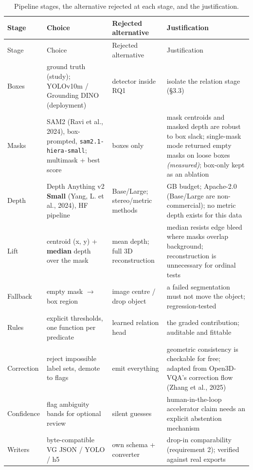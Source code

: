 \begin{center}
\setlength{\tabcolsep}{3pt}
\footnotesize
\begin{longtable}{>{\raggedright\arraybackslash}p{}>{\raggedright\arraybackslash}p{}>{\raggedright\arraybackslash}p{}>{\raggedright\arraybackslash}p{}}
\caption[Pipeline stages, the alternative rejected at each stage]{Pipeline stages, the alternative rejected at each stage, and the justification.}\\
\hline
Stage & Choice & Rejected alternative & Justification \\
\hline
\endfirsthead
\hline
Stage & Choice & Rejected alternative & Justification \\
\hline
\endhead
Boxes & ground truth (study); YOLOv10m / Grounding DINO (deployment) & detector inside RQ1 & isolate the relation stage (\S{}3.3) \\
Masks & SAM2 (Ravi et al., 2024), box-prompted, \texttt{sam2.1-hiera-small}; multimask + best score & boxes only & mask centroids and masked depth are robust to box slack; single-mask mode returned empty masks on loose boxes \textit{(measured)}; box-only kept as an ablation \\
Depth & Depth Anything v2 \textbf{Small} (Yang, L. et al., 2024), HF pipeline & Base/Large; stereo/metric methods & 6 GB budget; Apache-2.0 (Base/Large are non-commercial); no metric depth exists for this data \\
Lift & centroid (x, y) + \textbf{median} depth over the mask & mean depth; full 3D reconstruction & median resists edge bleed where masks overlap background; reconstruction is unnecessary for ordinal tests \\
Fallback & empty mask $\rightarrow$ box region & image centre / drop object & a failed segmentation must not move the object; regression-tested \\
Rules & explicit thresholds, one function per predicate & learned relation head & the graded contribution; auditable and fittable \\
Correction & reject impossible label sets, demote to flags & emit everything & geometric consistency is checkable for free; adapted from Open3D-VQA's correction flow (Zhang et al., 2025) \\
Confidence & flag ambiguity bands for optional review & silent guesses & human-in-the-loop accelerator claim needs an explicit abstention mechanism \\
Writers & byte-compatible VG JSON / YOLO / h5 & own schema + converter & drop-in comparability (requirement 2); verified against real exports \\
\hline
\end{longtable}
\end{center}


